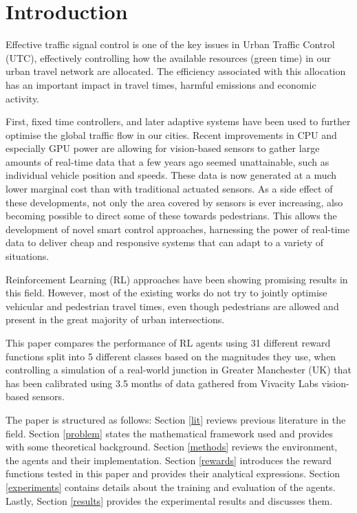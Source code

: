 \documentclass[conference]{IEEEtran}
\begin{document}
\IEEEpeerreviewmaketitle

\section{Introduction}
Effective traffic signal control is one of the key issues in Urban Traffic Control (UTC), effectively controlling how the available resources (green time) in our urban travel network are allocated.
The efficiency associated with this allocation has an important impact in travel times, harmful emissions and economic activity.

First, fixed time controllers, and later adaptive systems have been used to further optimise the global traffic flow in our cities.
Recent improvements in CPU and especially GPU power are allowing for vision-based sensors to gather large amounts of real-time data that a few years ago seemed unattainable, such as individual vehicle position and speeds.
These data is now generated at a much lower marginal cost than with traditional actuated sensors.
As a side effect of these developments, not only the area covered by sensors is ever increasing, also becoming possible to direct some of these towards pedestrians.
This allows the development of novel smart control approaches, harnessing the power of real-time data to deliver cheap and responsive systems that can adapt to a variety of situations.

Reinforcement Learning (RL) approaches have been showing promising results in this field.
However, most of the existing works do not try to jointly optimise vehicular and pedestrian travel times, even though pedestrians are allowed and present in the great majority of urban intersections.

This paper compares the performance of RL agents using 31 different reward functions split into 5 different classes based on the magnitudes they use, when controlling a simulation of a real-world junction in Greater Manchester (UK) that has been calibrated using 3.5 months of data gathered from Vivacity Labs vision-based sensors.

The paper is structured as follows:
Section \ref{lit} reviews previous literature in the field.
Section \ref{problem} states the mathematical framework used and provides with some theoretical background.  
Section \ref{methods} reviews the environment, the agents and their implementation.
Section \ref{rewards} introduces the reward functions tested in this paper and provides their analytical expressions.
Section \ref{experiments} contains details about the training and evaluation of the agents.
Lastly, Section \ref{results} provides the experimental results and discusses them.
\end{document}
